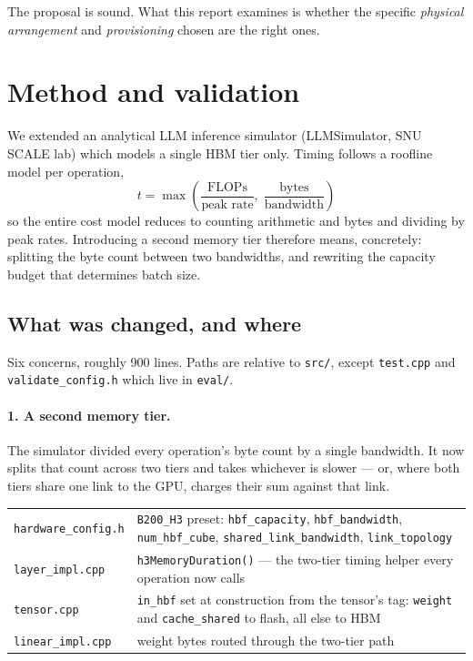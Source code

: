 \documentclass[11pt,a4paper]{article}
\newcommand{\code}[1]{\texttt{#1}}
\begin{document}
The proposal is sound. What this report examines is whether the specific
\emph{physical arrangement} and \emph{provisioning} chosen are the right ones.

\section{Method and validation}

We extended an analytical LLM inference simulator (LLMSimulator, SNU SCALE lab)
which models a single HBM tier only. Timing follows a roofline model per
operation,
\[
  t = \max\!\left(\frac{\text{FLOPs}}{\text{peak rate}},\;
                  \frac{\text{bytes}}{\text{bandwidth}}\right)
\]
so the entire cost model reduces to counting arithmetic and bytes and dividing
by peak rates. Introducing a second memory tier therefore means, concretely:
splitting the byte count between two bandwidths, and rewriting the capacity
budget that determines batch size.

\subsection{What was changed, and where}

Six concerns, roughly 900 lines. Paths are relative to \code{src/}, except
\code{test.cpp} and \code{validate\_config.h} which live in \code{eval/}.

\paragraph{1. A second memory tier.}
The simulator divided every operation's byte count by a single bandwidth. It now
splits that count across two tiers and takes whichever is slower --- or, where
both tiers share one link to the GPU, charges their sum against that link.

\begin{center}\small
\begin{tabular}{@{}p{5.0cm}p{9.3cm}@{}}
\toprule
\code{hardware\_config.h} & \code{B200\_H3} preset: \code{hbf\_capacity},
  \code{hbf\_bandwidth}, \code{num\_hbf\_cube},
  \code{shared\_link\_bandwidth}, \code{link\_topology} \\
\code{layer\_impl.cpp} & \code{h3MemoryDuration()} --- the two-tier timing
  helper every operation now calls \\
\code{tensor.cpp} & \code{in\_hbf} set at construction from the tensor's tag:
  \code{weight} and \code{cache\_shared} to flash, all else to HBM \\
\code{linear\_impl.cpp} & weight bytes routed through the two-tier path \\
\bottomrule
\end{tabular}
\end{center}
\end{document}
